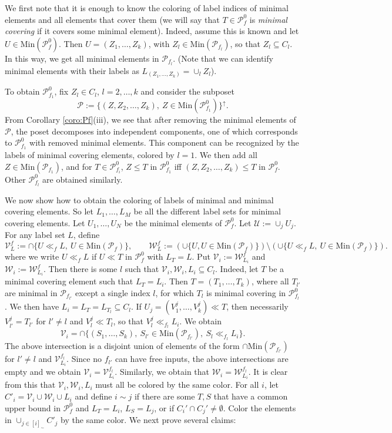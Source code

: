\documentclass[12pt]{article}
\theoremstyle{definition}
\theoremstyle{remark}
\def\cover{\ll}
\def\Pe{\mathcal P}
\begin{document}
We first note that it is enough to know the coloring of label indices of minimal elements and all
elements that cover them (we will say that $T\in \Pe_f^0$ is {\em minimal covering} if it
covers some minimal element). Indeed, assume this is known and let $U\in
\mathrm{Min}(\Pe_f^0)$. Then $U=(Z_1,\dots, Z_k)$, with
  $Z_l\in \mathrm{Min}(\Pe_{f_l})$, so that $Z_l\subseteq C_l$. In this way, we get all
minimal  elements in $\Pe_{f_l}$. (Note that we can identify minimal elements with their
labels as  $L_{(Z_1,\dots,Z_k)}=\cup_l Z_l$).

To obtain $\Pe_{f_1}^0$,
fix $Z_l\in C_l$, $l=2,\dots,k$ and consider the subposet 
\[
\Pe:=\{(Z,Z_2,\dots,Z_k),\ Z\in \mathrm{Min}(\Pe_{f_1}^0)\}^\uparrow.
\]
From Corollary
\ref{coro:Pf}(iii), we see that after removing the minimal elements of $\Pe$, the poset
decomposes into independent components, one of which corresponds to $\Pe_{f_1}^0$ with
removed minimal elements. This component can be recognized by the labels of minimal
covering elements, colored by $l=1$. We then add all $Z\in \mathrm{Min}(\Pe_{f_1})$,
and for $T\in \Pe_{f_i}^0$, $Z\le T$ in $\Pe_{f_1}^0$ iff
$(Z,Z_2,\dots,Z_k)\le T$ in $\Pe_f^0$.
Other $\Pe_{f_l}^0$ are obtained similarly.


We now show how to obtain the coloring of labels of minimal and minimal covering elements. 
So let $L_1,\dots, L_M$ be all the different label sets for minimal covering elements. Let
$U_1,\dots, U_N$ be the minimal elements of $\Pe_f^0$. Let $\mathcal U:=\cup_j U_j$.
For any label set $L$, define
\[
\mathcal V_L^f:=\cap \{U\cover_f L,\ U\in \mathrm{Min}(\Pe_f)\},\qquad \mathcal
W_L^f:=(\cup \{U, U\in \mathrm{Min}(\Pe_f)\})\setminus (\cup\{U\cover_f L,\ U\in
\mathrm{Min}(\Pe_f) \}).
\]
where we write $U\cover_f L$ if $U\cover T$ in $\mathcal P_f^0$ with $L_T=L$.  Put $\mathcal V_i:=\mathcal
W^f_{L_i}$ and $\mathcal W_i:=\mathcal W_{L_i}^f$. Then  there is some $l$
such that  $\mathcal V_i, \mathcal W_i,  L_i\subseteq C_l$. Indeed,  let $T$ be a minimal
covering element such that
$L_T=L_i$. Then $T=(T_1,\dots,T_k)$, where all $T_{l'}$ are minimal in $\Pe_{f_{l'}}$ except a
single index $l$, for which $T_{l}$ is minimal covering in $\Pe_{f_{l}}^0$. We then
have $L_i=L_T=L_{T_{l}}\subseteq C_{l}$. If
$U_j=(V^j_1,\dots,V^j_k)\cover T$, then necessarily $V^j_{l'}=T_{l'}$ for $l'\ne l$ and $V^j_{l}\cover
T_{l}$, so that $V^j_{l}\cover_{f_l} L_i$. We obtain 
\[
\mathcal V_i=\cap\{ (S_1,\dots,S_k),\ S_{l'}\in \mathrm{Min}(\Pe_{f_{l'}}),\
S_{l}\cover_{f_l}
L_i\}.
\]
The above intersection is a disjoint union of elements of the form
$\cap\mathrm{Min}(\Pe_{f_{l'}})$ for $l'\ne l$ and $\mathcal
V_{L_i}^{f_l}$. Since no $f_{l'}$ can have free inputs, the above
intersections are empty and we obtain
$\mathcal V_i=\mathcal V_{L_i}^{f_{l}}$.
Similarly, we obtain that 
$\mathcal W_i=\mathcal W_{L_i}^{f_{l}}$.
 It is clear from this that $\mathcal
V_i,\mathcal W_i,L_i$ must all be colored by the same color. For all $i$, let
$C'_i=\mathcal V_i\cup \mathcal W_i\cup L_i$ and define $i\sim j$ if  there are some
$T,S$ that have a common upper bound in $\Pe_f^0$ and $L_T=L_i$, $L_S=L_j$, or if $C_i'\cap C_j'\ne
\emptyset$. Color the elements in  $\cup_{j\in [i]_\sim} C'_j$ by the same color.
We next prove several claims:
\end{document}
